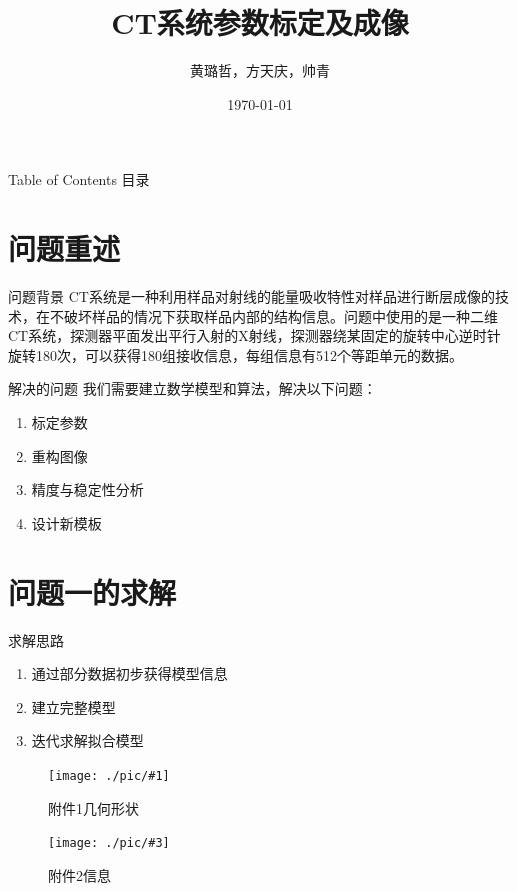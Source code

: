 \documentclass{beamer}
\newcommand{\doublepic}[4]{ \begin{figure}[H]
\begin{minipage}[H]{0.45\textwidth}
\centering
\texttt{[image: ./pic/\#1]}
\caption{#2}
\end{minipage}
\begin{minipage}[H]{0.45\textwidth}
\centering
\texttt{[image: ./pic/\#3]}
\caption{#4}
\end{minipage}
\end{figure}}
\begin{document}
 

  \title{CT系统参数标定及成像}
  \author{黄璐哲，方天庆，帅青}
  \date{\today}

  \begin{frame}[plain,t]
    \titlepage
  \end{frame} 
  
  \begin{frame}{Table of Contents 目录}
    \tableofcontents
  \end{frame} 
  
  \section{问题重述}
  \begin{frame}{问题背景}
    CT系统是一种利用样品对射线的能量吸收特性对样品进行断层成像的技术，在不破坏样品的情况下获取样品内部的结构信息。问题中使用的是一种二维CT系统，探测器平面发出平行入射的X射线，探测器绕某固定的旋转中心逆时针旋转180次，可以获得180组接收信息，每组信息有512个等距单元的数据。
  \end{frame} %

  \begin{frame}{解决的问题}
    我们需要建立数学模型和算法，解决以下问题：
    \begin{enumerate}
    
    \item 标定参数
    
    \item 重构图像
    \item 精度与稳定性分析
    \item 设计新模板
    \end{enumerate}
  \end{frame} %

  \section{问题一的求解}
  
  \begin{frame}{求解思路}
    \begin{enumerate}
      \item 通过部分数据初步获得模型信息
      \item 建立完整模型
      \item 迭代求解拟合模型
    \end{enumerate}
    \doublepic{fujian1.png}{附件1几何形状}{fujian2.png}{附件2信息}
  \end{frame}
\end{document}
